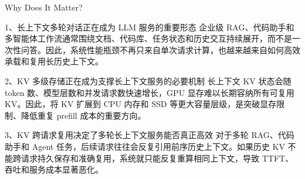 \documentclass[aspectratio=169,10pt]{beamer}
\begin{document}
\begin{frame}[t]{Why Does It Matter?}
\vspace{0.35em}

\begin{block}{1、长上下文多轮对话正在成为 LLM 服务的重要形态}
企业级 RAG、代码助手和多智能体工作流通常围绕文档、代码库、任务状态和历史交互持续展开，而不是一次性问答。因此，系统性能瓶颈不再只来自单次请求计算，也越来越来自如何高效承载和复用长历史上下文。
\end{block}

\vspace{0.35em}

\begin{block}{2、KV 多级存储正在成为支撑长上下文服务的必要机制}
长上下文 KV 状态会随 token 数、模型层数和并发请求数快速增长，GPU 显存难以长期容纳所有可复用 KV。因此，将 KV 扩展到 CPU 内存和 SSD 等更大容量层级，是突破显存限制、降低重复 prefill 成本的重要方向。
\end{block}

\vspace{0.35em}

\begin{block}{3、KV 跨请求复用决定了多轮长上下文服务能否真正高效}
对于多轮 RAG、代码助手和 Agent 任务，后续请求往往会反复引用前序历史上下文。如果历史 KV 不能跨请求持久保存和准确复用，系统就只能反复重算相同上下文，导致 TTFT、吞吐和服务成本显著恶化。
\end{block}
\end{frame}
\end{document}
